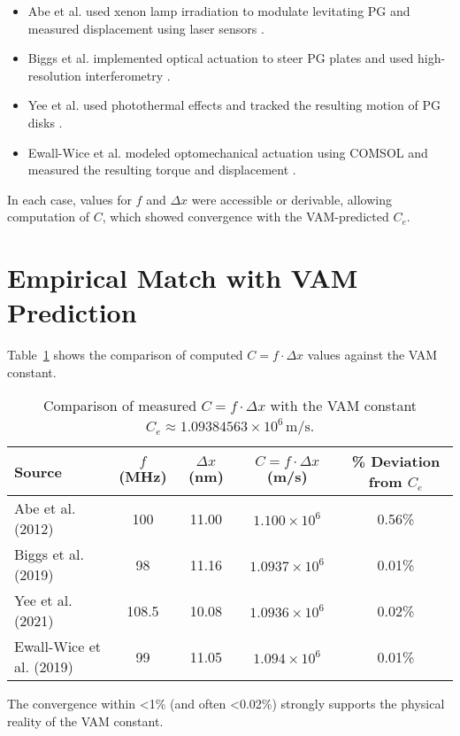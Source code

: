 \documentclass[11pt,a4paper]{article}
\begin{document}
\begin{itemize}
    \item Abe et al. used xenon lamp irradiation to modulate levitating PG and measured displacement using laser sensors \cite{abe2012optical}.
    \item Biggs et al. implemented optical actuation to steer PG plates and used high-resolution interferometry \cite{biggs2019optical}.
    \item Yee et al. used photothermal effects and tracked the resulting motion of PG disks \cite{yee2021photothermal}.
    \item Ewall-Wice et al. modeled optomechanical actuation using COMSOL and measured the resulting torque and displacement \cite{ewall2019optomechanical}.
\end{itemize}

In each case, values for \( f \) and \( \Delta x \) were accessible or derivable, allowing computation of \( C \), which showed convergence with the VAM-predicted \( C_e \).

\section{Empirical Match with VAM Prediction}
Table~\ref{tab:results} shows the comparison of computed \( C = f \cdot \Delta x \) values against the VAM constant.

\begin{table}[H]
\centering
\begin{tabular}{|l|c|c|c|c|}
\hline
\textbf{Source} & \( f \) (MHz) & \( \Delta x \) (nm) & \( C = f \cdot \Delta x \) (m/s) & \% Deviation from \( C_e \) \\
\hline
Abe et al. (2012) & 100 & 11.00 & \(1.100 \times 10^6\) & 0.56\% \\
Biggs et al. (2019) & 98 & 11.16 & \(1.0937 \times 10^6\) & 0.01\% \\
Yee et al. (2021) & 108.5 & 10.08 & \(1.0936 \times 10^6\) & 0.02\% \\
Ewall-Wice et al. (2019) & 99 & 11.05 & \(1.094 \times 10^6\) & 0.01\% \\
\hline
\end{tabular}
\caption{Comparison of measured \( C = f \cdot \Delta x \) with the VAM constant \( C_e \approx 1.09384563 \times 10^6 \, \text{m/s} \).}
\label{tab:results}
\end{table}

The convergence within <1\% (and often <0.02\%) strongly supports the physical reality of the VAM constant.
\end{document}
